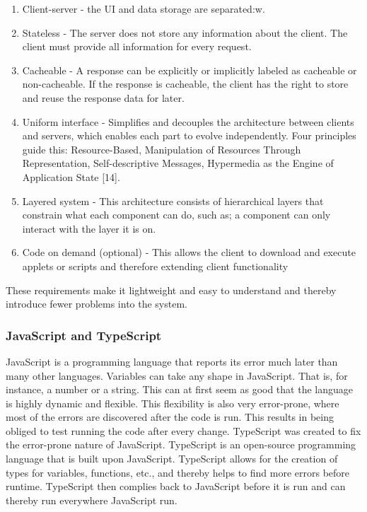 \begin{enumerate}
  \item Client-server - the UI and data storage are separated:w. 
  \item Stateless - The server does not store any information about the client. The client must provide all information for every request. 
  \item Cacheable - A response can be explicitly or implicitly labeled as cacheable or non-cacheable. If the response is cacheable, the client has the right to store and reuse the response data for later. 
  \item Uniform interface - Simplifies and decouples the architecture between clients and servers, which enables each part to evolve independently. Four principles guide this: Resource-Based, Manipulation of Resources Through Representation, Self-descriptive Messages, Hypermedia as the Engine of Application State [14]. 
  \item Layered system - This architecture consists of hierarchical layers that constrain what each component can do, such as; a component can only interact with the layer it is on. 
  \item Code on demand (optional) - This allows the client to download and execute applets or scripts and therefore extending client functionality 
\end{enumerate}

These requirements make it lightweight and easy to understand and thereby introduce fewer problems into the system. 


\subsubsection{JavaScript and TypeScript}%
\label{ssub:JavaScript and TypeScript}

JavaScript is a programming language that reports its error much later than many other languages. Variables can take any shape in JavaScript. That is, for instance, a number or a string. This can at first seem as good that the language is highly dynamic and flexible. This flexibility is also very error-prone, where most of the errors are discovered after the code is run. This results in being obliged to test running the code after every change\cite{taivalsaari2008web}. TypeScript was created to fix the error-prone nature of JavaScript. TypeScript is an open-source programming language that is built upon JavaScript. TypeScript allows for the creation of types for variables, functions, etc., and thereby helps to find more errors before runtime. TypeScript then complies back to JavaScript before it is run and can thereby run everywhere JavaScript run.  


